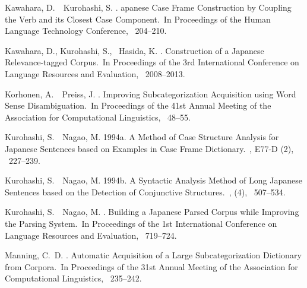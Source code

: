\documentclass[english]{jnlp_1.4_rep}
\begin{document}
\begin{thebibliography}{}
Kawahara, D.\BBACOMMA\ \BBA\ Kurohashi, S. \BBCP.
\newblock {}apanese Case Frame Construction by Coupling the Verb and its
  Closest Case Component.\BBCQ\
\newblock In {\Bem Proceedings of the Human Language Technology Conference},
  \mbox{\BPGS\ 204--210}.

Kawahara, D., Kurohashi, S., \BBA\ Hasida, K. \BBOP 2002\BBCP.
\newblock \BBOQ Construction of a {J}apanese Relevance-tagged Corpus.\BBCQ\
\newblock In {\Bem Proceedings of the 3rd International Conference on Language
  Resources and Evaluation}, \mbox{\BPGS\ 2008--2013}.

Korhonen, A.\BBACOMMA\ \BBA\ Preiss, J. \BBOP 2003\BBCP.
\newblock \BBOQ Improving Subcategorization Acquisition using Word Sense
  Disambiguation.\BBCQ\
\newblock In {\Bem Proceedings of the 41st Annual Meeting of the Association
  for Computational Linguistics}, \mbox{\BPGS\ 48--55}.

Kurohashi, S.\BBACOMMA\ \BBA\ Nagao, M. \BBOP 1994a\BBCP.
\newblock \BBOQ A Method of Case Structure Analysis for {J}apanese Sentences
  based on Examples in Case Frame Dictionary.\BBCQ\
, {\Bbf E77-D}
  (2), \mbox{\BPGS\ 227--239}.

Kurohashi, S.\BBACOMMA\ \BBA\ Nagao, M. \BBOP 1994b\BBCP.
\newblock \BBOQ A Syntactic Analysis Method of Long {J}apanese Sentences based
  on the Detection of Conjunctive Structures.\BBCQ\
, {}  (4), \mbox{\BPGS\
  507--534}.

Kurohashi, S.\BBACOMMA\ \BBA\ Nagao, M. \BBCP.
\newblock \BBOQ Building a {J}apanese Parsed Corpus while Improving the Parsing
  System.\BBCQ\
\newblock In {\Bem Proceedings of the 1st International Conference on Language
  Resources and Evaluation}, \mbox{\BPGS\ 719--724}.

Manning, C.~D. \BBOP 1993\BBCP.
\newblock \BBOQ Automatic Acquisition of a Large Subcategorization Dictionary
  from Corpora.\BBCQ\
\newblock In {\Bem Proceedings of the 31st Annual Meeting of the Association
  for Computational Linguistics}, \mbox{\BPGS\ 235--242}.


\end{thebibliography}
\end{document}
